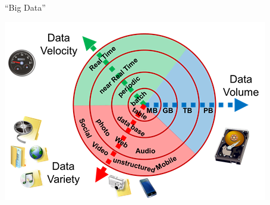 \documentclass[
  10pt,
  ignorenonframetext,
]{beamer}
\begin{document}
\begin{frame}{``Big Data''}
\label{big-data-1}
\begin{center}
       \includegraphics [width = .9\textwidth]{pics/0-bigdata.png}
 \end{center}
\end{frame}
\end{document}
